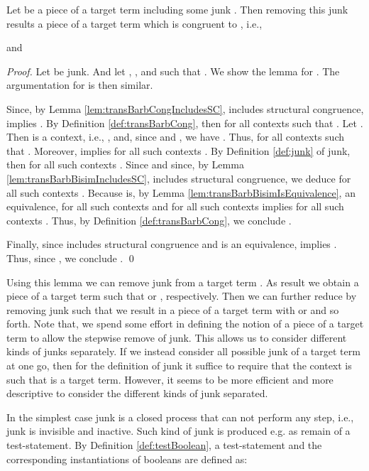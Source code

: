 \documentclass[]{llncs}
\begin{document}
\begin{lemma} \label{lem:removeJunk}
	Let  be a piece of a target term including some junk . Then removing this junk results a piece of a target term which is congruent to , i.e.,
	
	and
	
\end{lemma}

\begin{proof}
	Let  be junk. And let , , and  such that . We show the lemma for . The argumentation for  is then similar.
	
	Since, by Lemma \ref{lem:transBarbCongIncludesSC},  includes structural congruence,  implies . By Definition \ref{def:transBarbCong}, then  for all contexts  such that . Let . Then  is a context, i.e., , and, since  and , we have . Thus,  for all contexts  such that . Moreover,  implies  for all such contexts . By Definition \ref{def:junk} of junk, then  for all such contexts . Since  and since, by Lemma \ref{lem:transBarbBisimIncludesSC},  includes structural congruence, we deduce  for all such contexts . Because  is, by Lemma \ref{lem:transBarbBisimIsEquivalence}, an equivalence,  for all such contexts  and  for all such contexts  implies  for all such contexts . Thus, by Definition \ref{def:transBarbCong}, we conclude .
	
	Finally, since  includes structural congruence and is an equivalence,  implies . Thus, since , we conclude .
	\qed
\end{proof}

Using this lemma we can remove junk from a target term . As result we obtain a piece of a target term  such that  or , respectively. Then we can further reduce  by removing junk such that we result in a piece of a target term  with  or  and so forth. Note that, we spend some effort in defining the notion of a piece of a target term to allow the stepwise remove of junk. This allows us to consider different kinds of junks separately. If we instead consider all possible junk of a target term at one go, then for the definition of junk it suffice to require that the context  is such that  is a target term. However, it seems to be more efficient and more descriptive to consider the different kinds of junk separated.

In the simplest case junk is a closed process that can not perform any step, i.e., junk is invisible and inactive. Such kind of junk is produced e.g. as remain of a test-statement. By Definition \ref{def:testBoolean}, a test-statement and the corresponding instantiations of booleans are defined as:
\end{document}
